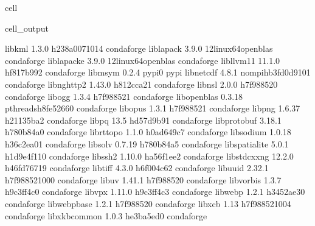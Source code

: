 \documentclass[letterpaper,table,10pt,english]{jupyterBook}
\begin{document}
\begin{sphinxuseclass}{cell}
\begin{sphinxVerbatimOutput}
\begin{sphinxuseclass}{cell_output}
\begin{sphinxVerbatim}[commandchars=\\\{\}]
libkml                    1.3.0             h238a007\PYGZus{}1014    conda\PYGZhy{}forge
liblapack                 3.9.0           12\PYGZus{}linux64\PYGZus{}openblas    conda\PYGZhy{}forge
liblapacke                3.9.0           12\PYGZus{}linux64\PYGZus{}openblas    conda\PYGZhy{}forge
libllvm11                 11.1.0               hf817b99\PYGZus{}2    conda\PYGZhy{}forge
libmsym                   0.2.4                    pypi\PYGZus{}0    pypi
libnetcdf                 4.8.1           nompi\PYGZus{}hb3fd0d9\PYGZus{}101    conda\PYGZhy{}forge
libnghttp2                1.43.0               h812cca2\PYGZus{}1    conda\PYGZhy{}forge
libnsl                    2.0.0                h7f98852\PYGZus{}0    conda\PYGZhy{}forge
libogg                    1.3.4                h7f98852\PYGZus{}1    conda\PYGZhy{}forge
libopenblas               0.3.18          pthreads\PYGZus{}h8fe5266\PYGZus{}0    conda\PYGZhy{}forge
libopus                   1.3.1                h7f98852\PYGZus{}1    conda\PYGZhy{}forge
libpng                    1.6.37               h21135ba\PYGZus{}2    conda\PYGZhy{}forge
libpq                     13.5                 hd57d9b9\PYGZus{}1    conda\PYGZhy{}forge
libprotobuf               3.18.1               h780b84a\PYGZus{}0    conda\PYGZhy{}forge
librttopo                 1.1.0                h0ad649c\PYGZus{}7    conda\PYGZhy{}forge
libsodium                 1.0.18               h36c2ea0\PYGZus{}1    conda\PYGZhy{}forge
libsolv                   0.7.19               h780b84a\PYGZus{}5    conda\PYGZhy{}forge
libspatialite             5.0.1               h1d9e4f1\PYGZus{}10    conda\PYGZhy{}forge
libssh2                   1.10.0               ha56f1ee\PYGZus{}2    conda\PYGZhy{}forge
libstdcxx\PYGZhy{}ng              12.2.0              h46fd767\PYGZus{}19    conda\PYGZhy{}forge
libtiff                   4.3.0                h6f004c6\PYGZus{}2    conda\PYGZhy{}forge
libuuid                   2.32.1            h7f98852\PYGZus{}1000    conda\PYGZhy{}forge
libuv                     1.41.1               h7f98852\PYGZus{}0    conda\PYGZhy{}forge
libvorbis                 1.3.7                h9c3ff4c\PYGZus{}0    conda\PYGZhy{}forge
libvpx                    1.11.0               h9c3ff4c\PYGZus{}3    conda\PYGZhy{}forge
libwebp                   1.2.1                h3452ae3\PYGZus{}0    conda\PYGZhy{}forge
libwebp\PYGZhy{}base              1.2.1                h7f98852\PYGZus{}0    conda\PYGZhy{}forge
libxcb                    1.13              h7f98852\PYGZus{}1004    conda\PYGZhy{}forge
libxkbcommon              1.0.3                he3ba5ed\PYGZus{}0    conda\PYGZhy{}forge

\end{sphinxVerbatim}
\end{sphinxuseclass}
\end{sphinxVerbatimOutput}
\end{sphinxuseclass}
\end{document}
